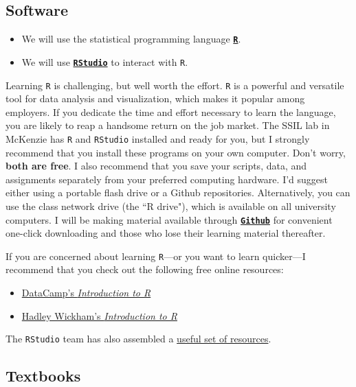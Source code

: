 \documentclass[10pt]{article}
\begin{document}
\subsection*{Software}

\begin{itemize}
	\item We will use the statistical programming language \href{https://www.r-project.org/}{\textbf{\texttt{R}}}.
	\item We will use \href{https://www.rstudio.com}{\textbf{\texttt{RStudio}}} to interact with \texttt{R}.
\end{itemize}
Learning \texttt{R} is challenging, but well worth the effort. \texttt{R} is a powerful and versatile tool for data analysis and visualization, which makes it popular among employers. If you dedicate the time and effort necessary to learn the language, you are likely to reap a handsome return on the job market. The SSIL lab in McKenzie has \texttt{R} and \texttt{RStudio} installed and ready for you, but I strongly recommend that you install these programs on your own computer. Don't worry, \textbf{both are free}. I also recommend that you save your scripts, data, and assignments separately from your preferred computing hardware. I'd suggest either using a portable flash drive or a Github repositories. Alternatively, you can use the class network drive (the ``R drive"), which is available on all university computers. I will be making material available through \href{https://github.com/peconomi/EC320_Econometrics}{\textbf{\texttt{Github}}} for convenient one-click downloading and those who lose their learning material thereafter. 

If you are concerned about learning \texttt{R}---or you want to learn quicker---I recommend that you check out the following free online resources:
\begin{itemize}
	\item \href{https://www.datacamp.com/courses/free-introduction-to-r}{DataCamp's \textit{Introduction to R}}
	\item \href{https://r4ds.had.co.nz/introduction.html}{Hadley Wickham's \textit{Introduction to R}}
\end{itemize}
The \texttt{RStudio} team has also assembled a \href{https://www.rstudio.com/online-learning/}{useful set of resources}.

\bigskip

\subsection*{Textbooks}
\end{document}
